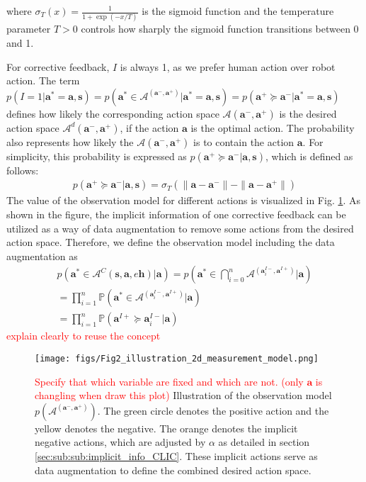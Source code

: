 where $\sigma_T(x) = \frac{1}{1 + \exp (- x/T)}$ is the sigmoid function and the temperature parameter $T > 0$ controls how sharply the sigmoid function transitions between 0 and 1. 

For corrective feedback, $I$ is always 1, as we prefer human action over robot action.
The term $p (I = 1 | \bm a^*= \bm a, \bm s) = p(\bm a^* \in \mathcal{A}^{(\bm a^-, \bm a^+)} |
\bm a^*=   \bm a, \bm s) =  p (\bm a^+ \succeq \bm a^- | \bm a^*= \bm a, \bm s )$  defines how  likely the corresponding action space $\mathcal{A}{(\bm a^-, \bm a^+)}$ is the desired action space $\mathcal{A}^d{(\bm a^-, \bm a^+)}$, if the action $\bm a$ is the optimal action.  
The probability also represents how likely the $\mathcal{A}{(\bm a^-, \bm a^+)}$ is to contain the action $\bm a$.
For simplicity, this probability is expressed as $ p (\bm a^+ \succeq \bm a^- | \bm a, \bm s)$, which is defined as follows:
\begin{align*}
    p (\bm a^+ \succeq \bm a^- | \bm a , \bm s) =   \sigma_T(\| \bm a- \bm a^-\| - \| \bm a- \bm a^+\|) 
\end{align*}
The value of the observation model for different actions is visualized in Fig. \ref{fig:Fig2_illustration_2d_measurement_model}. As shown in the figure, the implicit information of one corrective feedback can be utilized as a way of data augmentation to remove some actions from the desired action space. 
Therefore, we define the observation model including the data augmentation as
\begin{align*}
   p ( \bm a^* \in \mathcal{A}^{C} (\bm s, \bm a, e\bm h) |  \bm a) = 
    p \left(\bm a^* \in \bigcap_{i=0}^n \mathcal{A}^{ (\bm a^{I-}_i, \bm a^{I+})} | \bm a \right)
    \\
    = \prod_{i=1}^n \mathbb{P} (\bm a^* \in \mathcal{A}^{ (\bm a^{I-}_i, \bm a^{I+})}| \bm a) \\
    = \prod_{i=1}^n \mathbb{P} (\bm a^{I+} \succeq \bm a^{I-}_i| \bm a)
\end{align*}
\textcolor{red}{explain clearly to reuse the concept}

\begin{figure}[t]
	\centering
	\texttt{[image: figs/Fig2\_illustration\_2d\_measurement\_model.png]}
	\caption{ \textcolor{red}{Specify that which variable are fixed and which are not. (only $\bm a$ is changling when draw this plot)} Illustration of the observation model $p (\mathcal{A}^{(\bm a^-, \bm a^+)})$.  The green circle denotes the positive action and the yellow denotes the negative. The orange denotes the implicit negative actions, which are adjusted by $\alpha$ as detailed in section \ref{sec:sub:sub:implicit_info_CLIC}. These implicit actions serve as data augmentation to define the combined desired action space.}
	\label{fig:Fig2_illustration_2d_measurement_model}
\end{figure}


